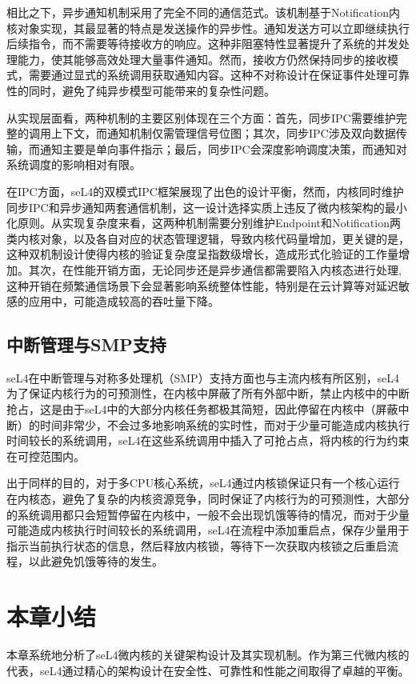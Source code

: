 相比之下，异步通知机制采用了完全不同的通信范式。该机制基于Notification内核对象实现，其最显著的特点是发送操作的异步性。通知发送方可以立即继续执行后续指令，而不需要等待接收方的响应。这种非阻塞特性显著提升了系统的并发处理能力，使其能够高效处理大量事件通知。然而，接收方仍然保持同步的接收模式，需要通过显式的系统调用获取通知内容。这种不对称设计在保证事件处理可靠性的同时，避免了纯异步模型可能带来的复杂性问题。

从实现层面看，两种机制的主要区别体现在三个方面：首先，同步IPC需要维护完整的调用上下文，而通知机制仅需管理信号位图；其次，同步IPC涉及双向数据传输，而通知主要是单向事件指示；最后，同步IPC会深度影响调度决策，而通知对系统调度的影响相对有限。

在IPC方面，seL4的双模式IPC框架展现了出色的设计平衡，然而，内核同时维护同步IPC和异步通知两套通信机制，这一设计选择实质上违反了微内核架构的最小化原则。从实现复杂度来看，这两种机制需要分别维护Endpoint和Notification两类内核对象，以及各自对应的状态管理逻辑，导致内核代码量增加，更关键的是，这种双机制设计使得内核的验证复杂度呈指数级增长，造成形式化验证的工作量增加。其次，在性能开销方面，无论同步还是异步通信都需要陷入内核态进行处理,这种开销在频繁通信场景下会显著影响系统整体性能，特别是在云计算等对延迟敏感的应用中，可能造成较高的吞吐量下降。

\subsection{中断管理与SMP支持}
seL4在中断管理与对称多处理机（SMP）支持方面也与主流内核有所区别，seL4为了保证内核行为的可预测性，在内核中屏蔽了所有外部中断，禁止内核中的中断抢占，这是由于seL4中的大部分内核任务都极其简短，因此停留在内核中（屏蔽中断）的时间非常少，不会过多地影响系统的实时性，而对于少量可能造成内核执行时间较长的系统调用，seL4在这些系统调用中插入了可抢占点，将内核的行为约束在可控范围内。

出于同样的目的，对于多CPU核心系统，seL4通过内核锁保证只有一个核心运行在内核态\cite{peters2015microkernel}，避免了复杂的内核资源竞争，同时保证了内核行为的可预测性，大部分的系统调用都只会短暂停留在内核中，一般不会出现饥饿等待的情况，而对于少量可能造成内核执行时间较长的系统调用，seL4在流程中添加重启点，保存少量用于指示当前执行状态的信息，然后释放内核锁，等待下一次获取内核锁之后重启流程，以此避免饥饿等待的发生。

\section{本章小结}
本章系统地分析了seL4微内核的关键架构设计及其实现机制。作为第三代微内核的代表，seL4通过精心的架构设计在安全性、可靠性和性能之间取得了卓越的平衡。

